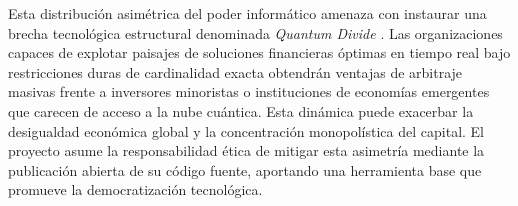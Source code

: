 Esta distribución asimétrica del poder informático amenaza con instaurar una brecha tecnológica estructural denominada \textit{Quantum Divide} \cite{NisqSociety2022}. Las organizaciones capaces de explotar paisajes de soluciones financieras óptimas en tiempo real bajo restricciones duras de cardinalidad exacta obtendrán ventajas de arbitraje masivas frente a inversores minoristas o instituciones de economías emergentes que carecen de acceso a la nube cuántica. Esta dinámica puede exacerbar la desigualdad económica global y la concentración monopolística del capital. El proyecto asume la responsabilidad ética de mitigar esta asimetría mediante la publicación abierta de su código fuente, aportando una herramienta base que promueve la democratización tecnológica.
